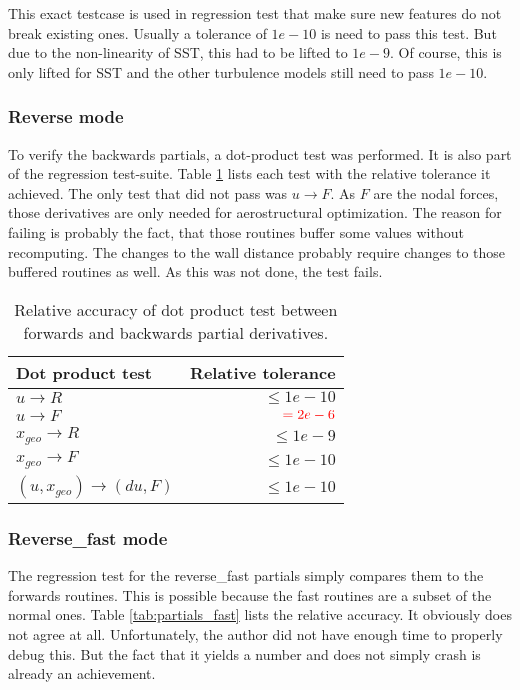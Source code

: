\noindent This exact testcase is used in regression test that make sure new
features do not break existing ones. Usually a tolerance of $1e-10$ is need to
pass this test. But due to the non-linearity of SST, this had to be lifted to
$1e-9$. Of course, this is only lifted for SST and the other turbulence models
still need to pass $1e-10$.


\subsubsection{Reverse mode}
To verify the backwards partials, a dot-product test was performed. It is also
part of the regression test-suite. Table \ref{tab:partials_dotproduct_test}
lists each test with the relative tolerance it achieved. The only test that
did not pass was $u \rightarrow F$. As $F$ are the nodal forces, those
derivatives are only needed for aerostructural optimization. The reason for
failing is probably the fact, that those routines buffer some values without
recomputing. The changes to the wall distance probably require changes to those
buffered routines as well. As this was not done, the test fails.

\begin{table}[H]
    \centering
    \begin{tabular}{l r}
        \toprule
        Dot product test                     & Relative tolerance \\
        \toprule
        $u \rightarrow R$                   & $\leq 1e-10$ \\
        $u \rightarrow F$                   & $\textcolor{red}{= 2e-6}$ \\
        \midrule
        $x_{geo} \rightarrow R$             & $\leq 1e-9$ \\
        $x_{geo} \rightarrow F$             & $\leq 1e-10$ \\
        \midrule
        $(u, x_{geo}) \rightarrow (du, F)$  & $\leq 1e-10$ \\
        \bottomrule
    \end{tabular}
    \caption{Relative accuracy of dot product test between forwards and
    backwards partial derivatives.}
    \label{tab:partials_dotproduct_test}
\end{table}


\subsubsection{Reverse\_fast mode}
The regression test for the reverse\_fast partials simply compares them to the
forwards routines. This is possible because the fast routines are a subset of
the normal ones. Table \ref{tab:partials_fast} lists the relative accuracy. It
obviously does not agree at all. Unfortunately, the author did not have enough
time to properly debug this. But the fact that it yields a number and does not
simply crash is already an achievement.

